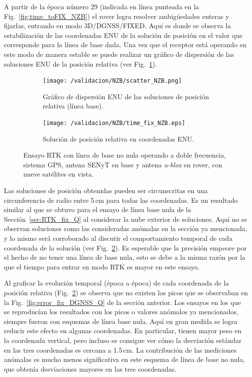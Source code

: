 \documentclass[a4paper,12pt,oneside,onecolumn,final,openright]{book}%
\begin{document}
	A partir de la época número 29 (indicada en línea punteada en la Fig.~\ref{fig:time_toFIX_NZB}) el rover logra resolver ambigüedades enteras y fijarlas, entrando en modo 3D/DGNSS/FIXED. Aquí es donde se observa la estabilización de las coordenadas ENU de la solución de posición en el valor que corresponde para la línea de base dada. Una vez que el receptor está operando en este modo de manera estable se puede realizar un gráfico de dispersión de las soluciones ENU de la posición relativa (ver Fig.~\ref{fig:scatter_NZB}).

\begin{figure}
\begin{subfigure}{1\linewidth}
\centering
  	\texttt{[image: /validacion/NZB/scatter\_NZB.png]}
  	\caption{Gráfico de dispersión ENU de las soluciones de posición relativa (línea base).}
    \label{fig:scatter_NZB}
\end{subfigure}

\begin{subfigure}{1\linewidth}
\centering
 	\texttt{[image: /validacion/NZB/time\_fix\_NZB.eps]}
 	\caption{Solución de posición relativa en coordenadas ENU.}
  	\label{fig:time_fix_NZB}
\end{subfigure}
\caption{Ensayo RTK con línea de base no nula operando a doble frecuencia, sistema GPS, antena SENyT en base y antena \textit{u-blox} en rover, con nueve satélites en vista.}
\label{fig:ensayo_NZB}
\end{figure}

	Las soluciones de posición obtenidas pueden ser circunscritas en una circunferencia de radio entre 5\,cm para todas las coordenadas. Es un resultado similar al que se obtuvo para el ensayo de línea base nula de la Sección~\ref{sec:RTK_fix_Q} al considerar la nube exterior de soluciones. Aquí no se observan soluciones como las consideradas anómalas en la sección ya mencionada, y lo mismo será corroborado al discutir el comportamiento temporal de cada coordenada de la solución (ver Fig.~\ref{fig:time_fix_NZB}). Es esperable que la precisión empeore por el hecho de no tener una línea de base nula, esto se debe a la misma razón por la que el tiempo para entrar en modo RTK es mayor en este ensayo.

	Al graficar la evolución temporal (época a época) de cada coordenada de la posición relativa (Fig.~\ref{fig:time_fix_NZB}) se observa que no existen los picos que se observaban en la Fig.~\ref{fig:error_fix_DGNSS_Q} de la sección anterior. Los ensayos en los que se reproducían los resultados con los picos o valores anómalos ya mencionados, siempre fueron con esquemas de línea base nula. Aquí en gran medida se logra reducir este efecto en algunas coordenadas. En particular, tienen mayor peso en la coordenada vertical, pero incluso se consigue ver cómo la desviación estándar en las tres coordenadas es cercana a 1.5\,cm. La contribución de las mediciones anómalas es mucho menos significativa en este esquema de línea de base no nula, que obtenía desviaciones mayores en las tres coordenadas.
	
\end{document}
